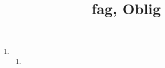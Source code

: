 

\title{fag, Oblig }

\pagestyle{fancy}
\fancyhf{}
\fancyfoot[CE,LO]{\leftmark}

\renewcommand{\headrulewidth}{2pt}
\renewcommand{\footrulewidth}{1pt}



	\mnfrontpage
	\begin{enumerate}
		\item %
		\begin{enumerate}
			\item %

			
		\end{enumerate}
	\end{enumerate}

